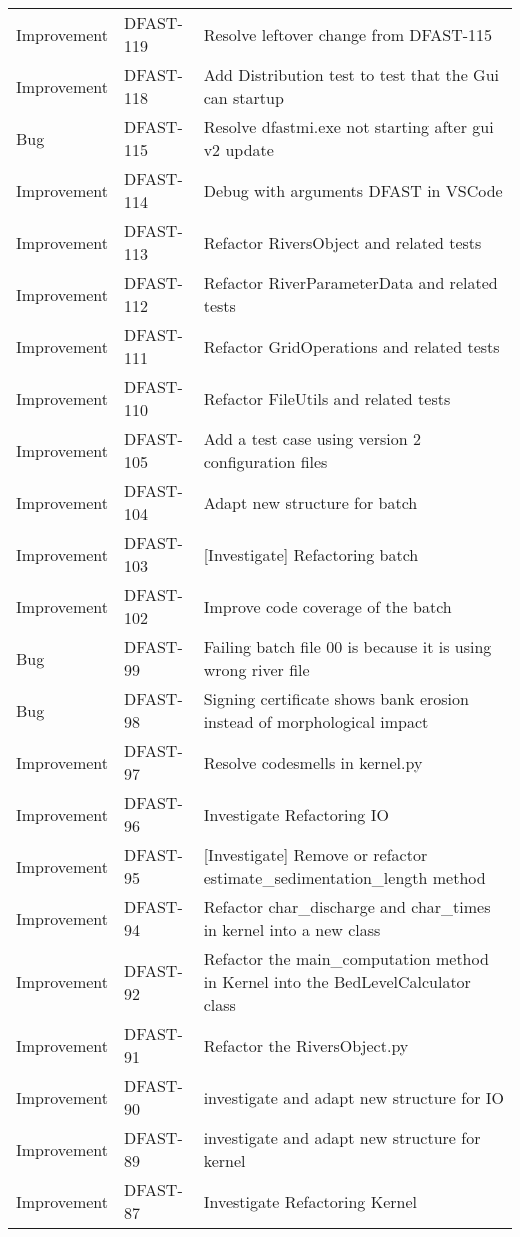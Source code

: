 \documentclass{deltares_memo}
\begin{document}
\begin{longtable}{l|l|p{8cm}}
Improvement & DFAST-119 & Resolve leftover change from DFAST-115 \\
Improvement & DFAST-118 & Add Distribution test to test that the Gui can startup \\
Bug & DFAST-115 & Resolve dfastmi.exe not starting after gui v2 update \\
Improvement & DFAST-114 & Debug with arguments DFAST in VSCode \\
Improvement & DFAST-113 & Refactor RiversObject and related tests \\
Improvement & DFAST-112 & Refactor RiverParameterData and related tests \\
Improvement & DFAST-111 & Refactor GridOperations and related tests \\
Improvement & DFAST-110 & Refactor FileUtils and related tests \\
Improvement & DFAST-105 & Add a test case using version 2 configuration files \\
Improvement & DFAST-104 & Adapt new structure for batch \\
Improvement & DFAST-103 & [Investigate] Refactoring batch \\
Improvement & DFAST-102 & Improve code coverage of the batch \\
Bug & DFAST-99 & Failing batch file 00 is because it is using wrong river file \\
Bug & DFAST-98 & Signing certificate shows bank erosion instead of morphological impact \\
Improvement & DFAST-97 & Resolve codesmells in kernel.py \\
Improvement & DFAST-96 & Investigate Refactoring IO \\
Improvement & DFAST-95 & [Investigate] Remove or refactor estimate\_sedimentation\_length method \\
Improvement & DFAST-94 & Refactor char\_discharge and char\_times in kernel into a new class \\
Improvement & DFAST-92 & Refactor the main\_computation method in Kernel into the BedLevelCalculator class \\
Improvement & DFAST-91 & Refactor the RiversObject.py \\
Improvement & DFAST-90 & investigate and adapt new structure for IO \\
Improvement & DFAST-89 & investigate and adapt new structure for kernel \\
Improvement & DFAST-87 & Investigate Refactoring Kernel \\

\end{longtable}
\end{document}
